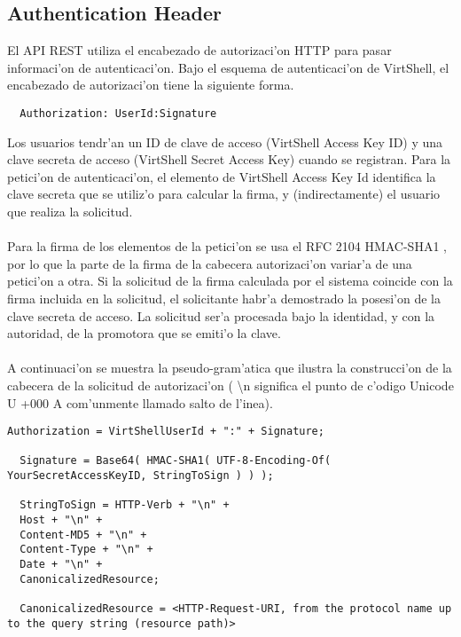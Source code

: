 \subsection{Authentication Header}

El API REST utiliza el encabezado de autorizaci'on HTTP para pasar informaci'on de autenticaci'on. Bajo el esquema de autenticaci'on de VirtShell, el encabezado de autorizaci'on tiene la siguiente forma.

\medskip
\begin{lstlisting}
  Authorization: UserId:Signature
\end{lstlisting}
\medskip

Los usuarios tendr'an un ID de clave de acceso (VirtShell Access Key ID) y una clave secreta de acceso (VirtShell Secret Access Key) cuando se registran. Para la petici'on de autenticaci'on, el elemento de VirtShell Access Key Id identifica la clave secreta que se utiliz'o para calcular la firma, y (indirectamente) el usuario que realiza la solicitud.\\
\\
Para la firma de los elementos de la petici'on se usa el RFC 2104 HMAC-SHA1 \cite{rfc2104}, por lo que la parte de la firma de la cabecera autorizaci'on variar'a de una petici'on a otra. Si la solicitud de la firma calculada por el sistema coincide con la firma incluida en la solicitud, el solicitante habr'a demostrado la posesi'on de la clave secreta de acceso. La solicitud ser'a procesada bajo la identidad, y con la autoridad, de la promotora que se emiti'o la clave.\\
\\
A continuaci'on se muestra la pseudo-gram'atica que ilustra la construcci'on de la cabecera de la solicitud de autorizaci'on (
\textbackslash{}n significa el punto de c'odigo Unicode U +000 A com'unmente llamado salto de l'inea).

\medskip
\begin{lstlisting}[basicstyle=\tiny]
  Authorization = VirtShellUserId + ":" + Signature;

  Signature = Base64( HMAC-SHA1( UTF-8-Encoding-Of( YourSecretAccessKeyID, StringToSign ) ) );

  StringToSign = HTTP-Verb + "\n" +
  Host + "\n" +
  Content-MD5 + "\n" +
  Content-Type + "\n" +
  Date + "\n" +
  CanonicalizedResource;

  CanonicalizedResource = <HTTP-Request-URI, from the protocol name up to the query string (resource path)>
\end{lstlisting}

